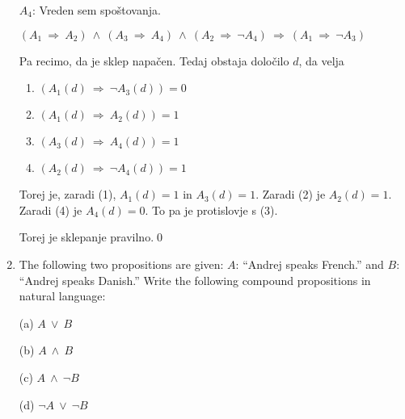 \documentclass[11pt,paper=b5,footinclude,headinclude]{scrbook} %
\def\ali {{~\vee~}}
\def\inn {{~\wedge~}}
\def\sledi {{~\Rightarrow~}}
\theoremstyle{remark}
\theoremstyle{definition} %
\theoremstyle{theorem} %
\begin{document}
\begin{enumerate}
$A_4$: Vreden sem spoštovanja.

$(A_1\sledi A_2)\inn (A_3\sledi A_4) \inn (A_2\sledi \neg A_4)\sledi (A_1\sledi \neg A_3)$

Pa recimo, da je sklep napačen. Tedaj obstaja določilo $d$, da velja
\begin{enumerate}[(1)]
  \item $(A_1(d)\sledi \neg A_3(d)) = 0$
  \item $(A_1(d)\sledi A_2(d)) = 1$
  \item $(A_3(d)\sledi A_4(d)) = 1$
  \item $(A_2(d)\sledi \neg A_4(d)) = 1$
\end{enumerate}
Torej je, zaradi (1), $A_1(d) = 1$ in $A_3(d) = 1$. Zaradi (2) je $A_2(d) = 1$.
Zaradi (4) je $A_4(d) = 0$. To pa je protislovje s (3).

Torej je sklepanje pravilno.\qed


%
%
%
%
%
%
%
%
%
%
%
%
%
%
%
%
%
%
%
%
%
%
%
%
%
%
%


\item
The following two propositions are given:
$A$: ``Andrej speaks French.'' and $B$: ``Andrej speaks Danish.''
Write the following compound propositions in natural language:

(a) $A\ali B$

(b) $A\inn B$

(c) $A\inn \neg B$

(d) $\neg A\ali \neg B$


\end{enumerate}
\end{document}
